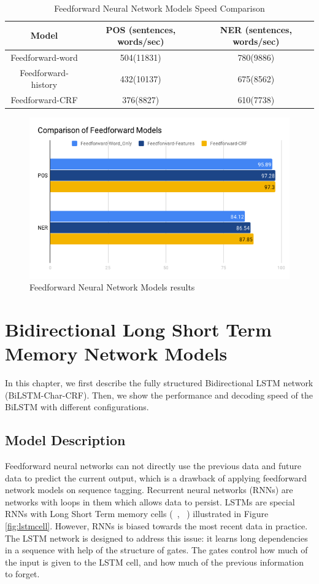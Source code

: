 \documentclass{sfuthesis}
\begin{document}
\begin{table}[]
\centering
\caption{Feedforward Neural Network Models Speed Comparison}
\label{table:ff-tabel2}
\begin{tabular}{|c|c|c|}
\hline
Model       & POS  (sentences, words/sec)  & NER  (sentences, words/sec)      \\ \hline
Feedforward-word    & 504(11831)     & 780(9886)    \\ \hline
Feedforward-history & 432(10137)     & 675(8562)     \\ \hline
Feedforward-CRF    & 376(8827)     & 610(7738)     \\ \hline
\end{tabular}
\end{table}

\begin{figure}
  \centering
  \includegraphics[scale=0.6]{ff.png}
 \caption{Feedforward Neural Network Models results}
  \label{fig:ff}
\end{figure}



\chapter{Bidirectional Long Short Term Memory Network Models}
In this chapter, we first describe the fully structured Bidirectional LSTM network (BiLSTM-Char-CRF). Then, we show the performance and decoding speed of the BiLSTM with different configurations.

\section{Model Description}
Feedforward neural networks can not directly use the previous data and future data to predict the current output, which is a drawback of applying feedforward network models on sequence tagging. 
Recurrent neural networks (RNNs) are networks with loops in them which allows data to persist. LSTMs are special RNNs with Long Short Term memory cells (~\citeauthor{graves2005framewise}, ~\citeyear{graves2005framewise}) illustrated in Figure \ref{fig:lstmcell}. However, RNNs is biased towards the most recent data in practice. The LSTM network is designed to address this issue: it learns long dependencies in a sequence with help of the structure of gates. The gates control how much of the input is given to the LSTM cell, and how much of the previous information to forget. 
\end{document}
